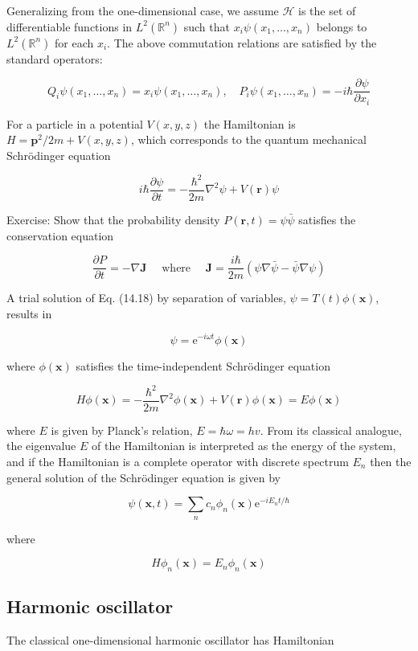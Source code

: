 \documentclass[10pt]{article}
\begin{document}
Generalizing from the one-dimensional case, we assume $\mathcal{H}$ is the set of differentiable functions in $L^{2}\left(\mathbb{R}^{n}\right)$ such that $x_{i} \psi\left(x_{1}, \ldots, x_{n}\right)$ belongs to $L^{2}\left(\mathbb{R}^{n}\right)$ for each $x_{i}$. The above commutation relations are satisfied by the standard operators:

$$
Q_{i} \psi\left(x_{1}, \ldots, x_{n}\right)=x_{i} \psi\left(x_{1}, \ldots, x_{n}\right), \quad P_{i} \psi\left(x_{1}, \ldots, x_{n}\right)=-i \hbar \frac{\partial \psi}{\partial x_{i}}
$$

For a particle in a potential $V(x, y, z)$ the Hamiltonian is $H=\mathbf{p}^{2} / 2 m+V(x, y, z)$, which corresponds to the quantum mechanical Schrödinger equation

$$
i \hbar \frac{\partial \psi}{\partial t}=-\frac{\hbar^{2}}{2 m} \nabla^{2} \psi+V(\mathbf{r}) \psi
$$

Exercise: Show that the probability density $P(\mathbf{r}, t)=\psi \bar{\psi}$ satisfies the conservation equation

$$
\frac{\partial P}{\partial t}=-\nabla \mathbf{J} \quad \text { where } \quad \mathbf{J}=\frac{i \hbar}{2 m}(\psi \nabla \bar{\psi}-\bar{\psi} \nabla \psi)
$$

A trial solution of Eq. (14.18) by separation of variables, $\psi=T(t) \phi(\mathbf{x})$, results in

$$
\psi=\mathrm{e}^{-i \omega t} \phi(\mathbf{x})
$$

where $\phi(\mathbf{x})$ satisfies the time-independent Schrödinger equation

$$
H \phi(\mathbf{x})=-\frac{\hbar^{2}}{2 m} \nabla^{2} \phi(\mathbf{x})+V(\mathbf{r}) \phi(\mathbf{x})=E \phi(\mathbf{x})
$$

where $E$ is given by Planck's relation, $E=\hbar \omega=h v$. From its classical analogue, the eigenvalue $E$ of the Hamiltonian is interpreted as the energy of the system, and if the Hamiltonian is a complete operator with discrete spectrum $E_{n}$ then the general solution of the Schrödinger equation is given by

$$
\psi(\mathbf{x}, t)=\sum_{n} c_{n} \phi_{n}(\mathbf{x}) \mathrm{e}^{-i E_{n} t / \hbar}
$$

where

$$
H \phi_{n}(\mathbf{x})=E_{n} \phi_{n}(\mathbf{x})
$$

\subsection{Harmonic oscillator}
The classical one-dimensional harmonic oscillator has Hamiltonian
\end{document}
